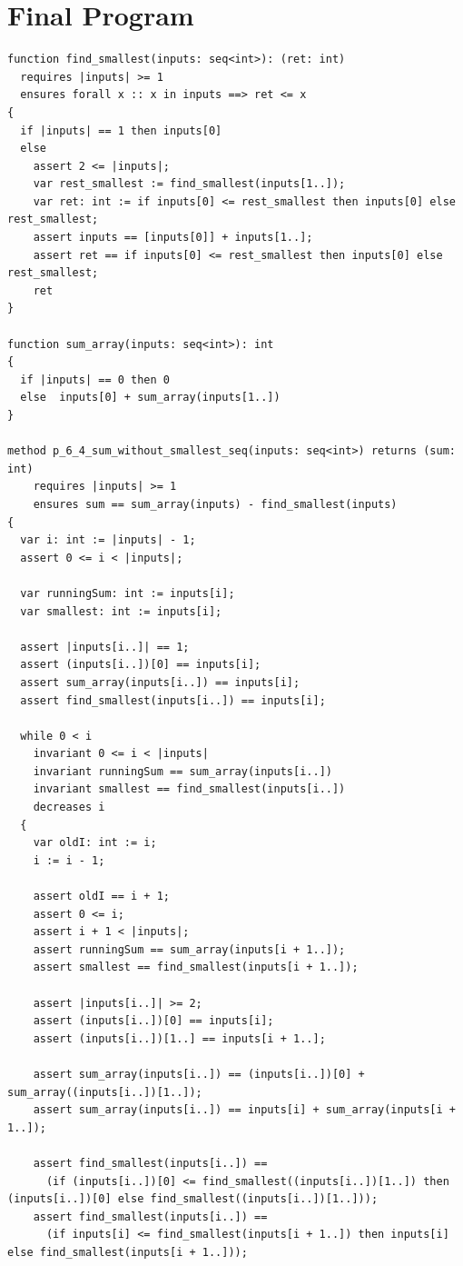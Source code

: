 \documentclass{article}
\begin{document}
\section*{Final Program}
\begin{lstlisting}
function find_smallest(inputs: seq<int>): (ret: int)
  requires |inputs| >= 1
  ensures forall x :: x in inputs ==> ret <= x 
{
  if |inputs| == 1 then inputs[0]
  else 
    assert 2 <= |inputs|;
    var rest_smallest := find_smallest(inputs[1..]);
    var ret: int := if inputs[0] <= rest_smallest then inputs[0] else rest_smallest;
    assert inputs == [inputs[0]] + inputs[1..]; 
    assert ret == if inputs[0] <= rest_smallest then inputs[0] else rest_smallest;
    ret 
}

function sum_array(inputs: seq<int>): int
{
  if |inputs| == 0 then 0
  else  inputs[0] + sum_array(inputs[1..])
}

method p_6_4_sum_without_smallest_seq(inputs: seq<int>) returns (sum: int)
	requires |inputs| >= 1
	ensures sum == sum_array(inputs) - find_smallest(inputs)
{
  var i: int := |inputs| - 1;
  assert 0 <= i < |inputs|;

  var runningSum: int := inputs[i];
  var smallest: int := inputs[i];

  assert |inputs[i..]| == 1;
  assert (inputs[i..])[0] == inputs[i];
  assert sum_array(inputs[i..]) == inputs[i];
  assert find_smallest(inputs[i..]) == inputs[i];

  while 0 < i
    invariant 0 <= i < |inputs|
    invariant runningSum == sum_array(inputs[i..])
    invariant smallest == find_smallest(inputs[i..])
    decreases i
  {
    var oldI: int := i;
    i := i - 1;

    assert oldI == i + 1;
    assert 0 <= i;
    assert i + 1 < |inputs|;
    assert runningSum == sum_array(inputs[i + 1..]);
    assert smallest == find_smallest(inputs[i + 1..]);

    assert |inputs[i..]| >= 2;
    assert (inputs[i..])[0] == inputs[i];
    assert (inputs[i..])[1..] == inputs[i + 1..];

    assert sum_array(inputs[i..]) == (inputs[i..])[0] + sum_array((inputs[i..])[1..]);
    assert sum_array(inputs[i..]) == inputs[i] + sum_array(inputs[i + 1..]);

    assert find_smallest(inputs[i..]) ==
      (if (inputs[i..])[0] <= find_smallest((inputs[i..])[1..]) then (inputs[i..])[0] else find_smallest((inputs[i..])[1..]));
    assert find_smallest(inputs[i..]) ==
      (if inputs[i] <= find_smallest(inputs[i + 1..]) then inputs[i] else find_smallest(inputs[i + 1..]));


\end{lstlisting}
\end{document}
